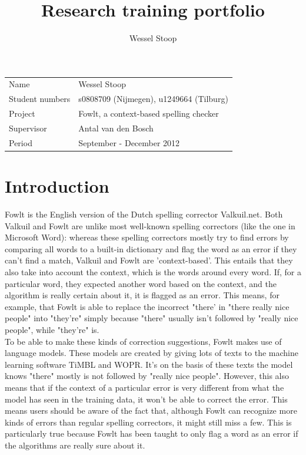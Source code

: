 \documentclass[12pt]{article}
\title{Research training portfolio}
\author{Wessel Stoop}
\let\stdsection\section
\renewcommand\section{\newpage\stdsection}
\begin{document}
\maketitle

\begin{table}[h]
\begin{tabular}{ll}
Name&Wessel Stoop\\
Student numbers&s0808709 (Nijmegen), u1249664 (Tilburg)\\
Project&Fowlt, a context-based spelling checker\\
Supervisor&Antal van den Bosch\\
Period&September - December 2012\\
\end{tabular}
\end{table}

\section{Introduction}
Fowlt is the English version of the Dutch spelling corrector Valkuil.net. Both Valkuil and Fowlt are unlike most well-known spelling correctors (like the one in Microsoft Word): whereas these spelling correctors mostly try to find errors by comparing all words to a built-in dictionary and flag the word as an error if they can't find a match, Valkuil and Fowlt are 'context-based'. This entails that they also take into account the context, which is the words around every word. If, for a particular word, they expected another word based on the context, and the algorithm is really certain about it, it is flagged as an error. This means, for example, that Fowlt is able to replace the incorrect "there' in "there really nice people" into "they're" simply because "there" usually isn't followed by "really nice people", while "they're" is. 
\\\indent
To be able to make these kinds of correction suggestions, Fowlt makes use of language models. These models are created by giving lots of texts to the machine learning software TiMBL and WOPR. It's on the basis of these texts the model knows "there" mostly is not followed by "really nice people". However, this also means that if the context of a particular error is very different from what the model has seen in the training data, it won't be able to correct the error. This means users should be aware of the fact that, although Fowlt can recognize more kinds of errors than regular spelling correctors, it might still miss a few. This is particularly true because Fowlt has been taught to only flag a word as an error if the algorithms are really sure about it.
\end{document}
